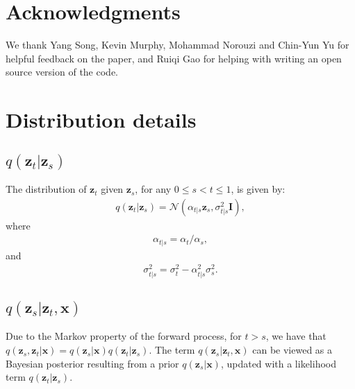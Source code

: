 \documentclass{article}
\def\rvx{{\mathbf{x}}}
\def\rvz{{\mathbf{z}}}
\newcommand{\bfI}{\mathbf{I}}
\begin{document}
\section*{Acknowledgments}
We thank Yang Song, Kevin Murphy, Mohammad Norouzi and Chin-Yun Yu for helpful feedback on the paper, and Ruiqi Gao for helping with writing an open source version of the code.












 


















\vfill
\pagebreak
\appendix

\section{Distribution details}
\label{sec:distributions}

\subsection{$q(\rvz_t|\rvz_s)$}
The distribution of $\rvz_t$ given $\rvz_s$, for any $0 \leq s < t \leq 1$, is given by:
\begin{align}
q(\rvz_t|\rvz_s) = \mathcal{N}\left(\alpha_{t|s} \rvz_s, \sigma^2_{t|s} \bfI\right),
\label{eq:zt_given_zs}
\end{align}
where
\begin{align}
\alpha_{t|s} = \alpha_t/\alpha_s,
\end{align}
and
\begin{align}
\sigma_{t|s}^2 = \sigma_t^2 - \alpha_{t|s}^2\sigma_s^2.
\end{align}



\subsection{$q(\rvz_s|\rvz_t,\rvx)$}
Due to the Markov property of the forward process, for $t > s$, we have that $q(\rvz_s, \rvz_t | \rvx) = q(\rvz_s | \rvx) q(\rvz_t | \rvz_s)$.
The term $q(\rvz_s|\rvz_t,\rvx)$ can be viewed as a Bayesian posterior resulting from a prior $q(\rvz_s|\rvx)$, updated with a likelihood term $q(\rvz_t|\rvz_s)$.
\end{document}
